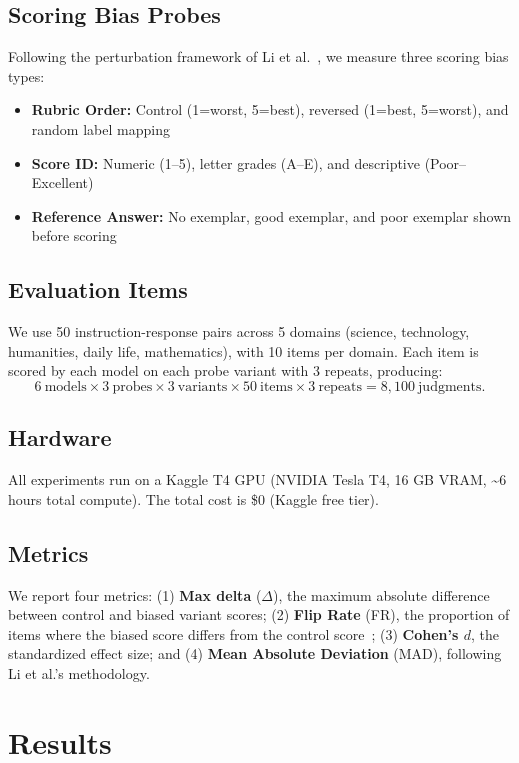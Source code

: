 \documentclass[11pt,twocolumn]{article}
\begin{document}
\subsection{Scoring Bias Probes}
Following the perturbation framework of Li et al.~\cite{li2025scoring}, we measure three scoring bias types:
\begin{itemize}
    \item \textbf{Rubric Order:} Control (1=worst, 5=best), reversed (1=best, 5=worst), and random label mapping
    \item \textbf{Score ID:} Numeric (1--5), letter grades (A--E), and descriptive (Poor--Excellent)
    \item \textbf{Reference Answer:} No exemplar, good exemplar, and poor exemplar shown before scoring
\end{itemize}

\subsection{Evaluation Items}
We use 50 instruction-response pairs across 5 domains (science, technology, humanities, daily life, mathematics), with 10 items per domain. Each item is scored by each model on each probe variant with 3 repeats, producing:
\[
6~\text{models} \times 3~\text{probes} \times 3~\text{variants} \times 50~\text{items} \times 3~\text{repeats} = 8,100~\text{judgments}.
\]

\subsection{Hardware}
All experiments run on a Kaggle T4 GPU (NVIDIA Tesla T4, 16 GB VRAM, \textasciitilde 6 hours total compute). The total cost is \$0 (Kaggle free tier).

\subsection{Metrics}
We report four metrics: (1) \textbf{Max delta} ($\Delta$), the maximum absolute difference between control and biased variant scores; (2) \textbf{Flip Rate} (FR), the proportion of items where the biased score differs from the control score~\cite{li2025scoring}; (3) \textbf{Cohen's $d$}, the standardized effect size; and (4) \textbf{Mean Absolute Deviation} (MAD), following Li et al.'s methodology.

\section{Results}
\end{document}
